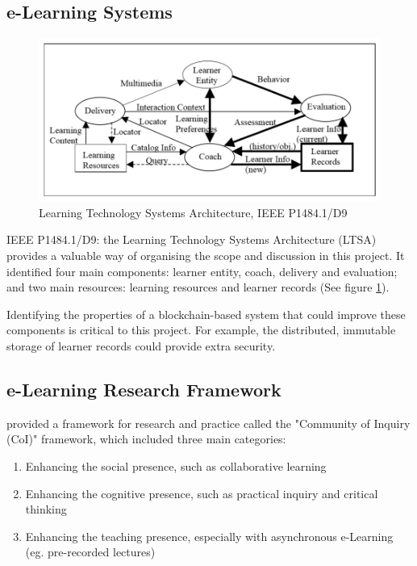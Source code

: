 \subsection{e-Learning Systems}

\begin{figure}[!ht] 
    \centering    
    \includegraphics[width=1.0\textwidth]{LTSA}
    \caption[Learning Technology Systems Architecture]
        {Learning Technology Systems Architecture, IEEE P1484.1/D9 \citep{farance1999learning}}
    \label{fig:LTSA}
\end{figure}

IEEE P1484.1/D9: the Learning Technology Systems Architecture (LTSA) provides a valuable way of organising 
the scope and discussion in this project. It identified four main components: learner entity, coach, 
delivery and evaluation; and two main resources: learning resources and learner records (See figure \ref{fig:LTSA}).

Identifying the properties of a blockchain-based system that could improve these components is 
critical to this project. For example, the distributed, immutable storage of learner records could 
provide extra security.

\subsection{e-Learning Research Framework}

\citet{garrison2011learning} provided a framework for research and practice called the "Community 
of Inquiry (CoI)" framework, which included three main categories:

\begin{enumerate}
    \item Enhancing the social presence, such as collaborative learning
    \item Enhancing the cognitive presence, such as practical inquiry and critical thinking
    \item Enhancing the teaching presence, especially with asynchronous e-Learning (eg. pre-recorded lectures)
\end{enumerate}

